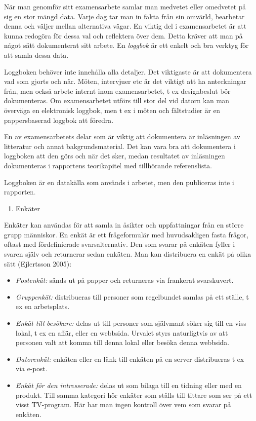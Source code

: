 När man genomför sitt examensarbete samlar man medvetet eller omedvetet
på sig en stor mängd data. Varje dag tar man in fakta från sin omvärld,
bearbetar denna och väljer mellan alternativa vägar. En viktig del i
examensarbetet är att kunna redogöra för dessa val och reflektera över
dem. Detta kräver att man på något sätt dokumenterat sitt arbete. En
\emph{loggbok} är ett enkelt och bra verktyg för att samla dessa data.

Loggboken behöver inte innehålla alla detaljer. Det viktigaste är att
dokumentera vad som gjorts och när. Möten, intervjuer etc är det viktigt
att ha anteckningar från, men också arbete internt inom examensarbetet,
t ex designbeslut bör dokumenteras. Om examensarbetet utförs till stor
del vid datorn kan man överväga en elektronisk loggbok, men t ex i möten
och fältstudier är en pappersbaserad loggbok att föredra.

En av examensarbetets delar som är viktig att dokumentera är inläsningen
av litteratur och annat bakgrundsmaterial. Det kan vara bra att
dokumentera i loggboken att den görs och när det sker, medan resultatet
av inläsningen dokumenteras i rapportens teorikapitel med tillhörande
referenslista.

Loggboken är en datakälla som används i arbetet, men den publiceras inte
i rapporten.

\begin{enumerate}
\def\labelenumi{\arabic{enumi}.}
\item
  Enkäter
\end{enumerate}

Enkäter kan användas för att samla in åsikter och uppfattningar från en
större grupp människor. En enkät är ett frågeformulär med huvudsakligen
fasta frågor, oftast med fördefinierade svarsalternativ. Den som svarar
på enkäten fyller i svaren själv och returnerar sedan enkäten. Man kan
distribuera en enkät på olika sätt (Ejlertsson 2005):

\begin{itemize}
\item
  \emph{Postenkät:} sänds ut på papper och returneras via frankerat
  svarskuvert.
\item
  \emph{Gruppenkät:} distribueras till personer som regelbundet samlas
  på ett ställe, t ex en arbetsplats.
\item
  \emph{Enkät till besökare:} delas ut till personer som självmant söker
  sig till en viss lokal, t ex en affär, eller en webbsida. Urvalet
  styrs naturligtvis av att personen valt att komma till denna lokal
  eller besöka denna webbsida.
\item
  \emph{Datorenkät:} enkäten eller en länk till enkäten på en server
  distribueras t ex via e-post.
\item
  \emph{Enkät för den intresserade:} delas ut som bilaga till en tidning
  eller med en produkt. Till samma kategori hör enkäter som ställs till
  tittare som ser på ett visst TV-program. Här har man ingen kontroll
  över vem som svarar på enkäten.
\end{itemize}

